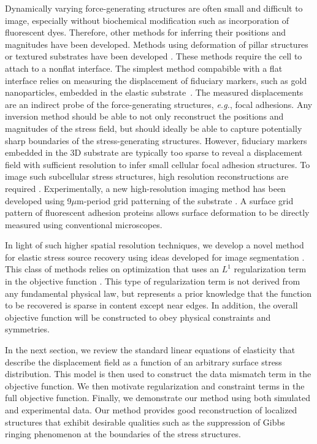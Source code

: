 \documentclass[aps,prl,reprint,twocolumn,groupedaddress,showpacs]{revtex4}
\begin{document}
Dynamically varying force-generating structures are often small and
difficult to image, especially without biochemical modification such
as incorporation of fluorescent dyes. Therefore, other methods for
inferring their positions and magnitudes have been developed. Methods
using deformation of pillar structures \cite{PILLAR} or textured
substrates have been developed \cite{PATTERN}.  These methods require
the cell to attach to a nonflat interface.  The simplest method
compabible with a flat interface relies on measuring the displacement
of fiduciary markers, such as gold nanoparticles, embedded in the
elastic substrate~\cite{WANG2007}. The measured displacements are an
indirect probe of the force-generating structures, \textit{e.g.},
focal adhesions.  Any inversion method should be able to not only
reconstruct the positions and magnitudes of the stress field, but
should ideally be able to capture potentially sharp boundaries of the
stress-generating structures. However, fiduciary markers embedded in
the 3D substrate are typically too sparse to reveal a displacement
field with sufficient resolution to infer small cellular focal
adhesion structures. To image such subcellular stress structures, high
resolution reconstructions are required \cite{USCHWARZ}.
Experimentally, a new high-resolution imaging method has been
developed using 9$\mu$m-period grid patterning of the substrate
\cite{POPESCU}.  A surface grid pattern of fluorescent adhesion
proteins allows surface deformation to be directly measured using
conventional microscopes.

In light of such higher spatial resolution techniques, we develop a
novel method for elastic stress source recovery using ideas developed
for image segmentation \cite{OSHER}.  This class of methods relies on
optimization that uses an $L^{1}$ regularization term in the objective
function \cite{CHAN}.  This type of regularization term is not derived
from any fundamental physical law, but represents a prior knowledge that
the function to be recovered is sparse in content except near
edges. In addition, the overall objective function will be constructed
to obey physical constraints and symmetries.

In the next section, we review the standard linear equations of
elasticity that describe the displacement field as a function of an
arbitrary surface stress distribution. This model is then used to
construct the data mismatch term in the objective function. We then
motivate regularization and constraint terms in the full
objective function. Finally, we demonstrate our method
using both simulated and experimental data. Our method provides
good reconstruction of localized structures that exhibit desirable
qualities such as the suppression of Gibbs ringing phenomenon at the
boundaries of the stress structures.
\end{document}
